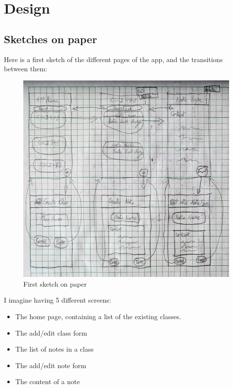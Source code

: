 \documentclass[]{article}
\begin{document}
	\pagebreak
	
	\section{Design}
	
	\subsection{Sketches on paper}
	
	Here is a first sketch of the different pages of the app, and the transitions between them:
	
	\begin{figure}[!htb]
		\centering
		\includegraphics[scale=0.1]{first_sketch}
		\caption{First sketch on paper}
	\end{figure}
	
	I imagine having 5 different screens:
	
	\begin{itemize}
		\item The home page, containing a list of the existing classes.
		\item The add/edit class form
		\item The list of notes in a class
		\item The add/edit note form
		\item The content of a note
	\end{itemize}
	
\end{document}
